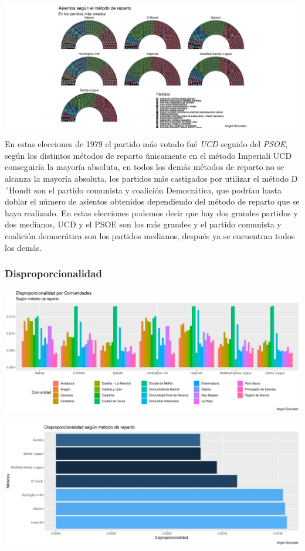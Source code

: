 \documentclass[12pt,a4paper,]{book}
\numberwithin{dummy}{section}
\theoremstyle{ocrenumbox}
\theoremstyle{blacknumex}
\theoremstyle{blacknumbox}
\theoremstyle{ocrenum}
\theoremstyle{ocrenum}
\begin{document}
\begin{center}\includegraphics[width=0.95\linewidth]{figurasR/unnamed-chunk-68-3} \end{center}

En estas elecciones de 1979 el partido más votado fué \emph{UCD} seguido
del \emph{PSOE}, según los distintos métodos de reparto únicamente en el
método Imperiali UCD conseguiría la mayoría absoluta, en todos los demás
métodos de reparto no se alcanza la mayoría absoluta, los partidos más
castigados por utilizar el método D´Hondt son el partido comunista y
coalición Democrática, que podrían hasta doblar el número de asientos
obtenidos dependiendo del método de reparto que se haya realizado. En
estas elecciones podemos decir que hay dos grandes partidos y dos
medianos, UCD y el PSOE son los más grandes y el partido comunista y
coalición democrática son los partidos medianos, después ya se
encuentran todos los demás.

\hypertarget{disproporcionalidad-1}{%
\subsubsection{Disproporcionalidad}\label{disproporcionalidad-1}}

\begin{center}\includegraphics[width=0.95\linewidth]{figurasR/unnamed-chunk-69-1} \end{center}

\begin{center}\includegraphics[width=0.95\linewidth]{figurasR/unnamed-chunk-69-2} \end{center}
\end{document}
